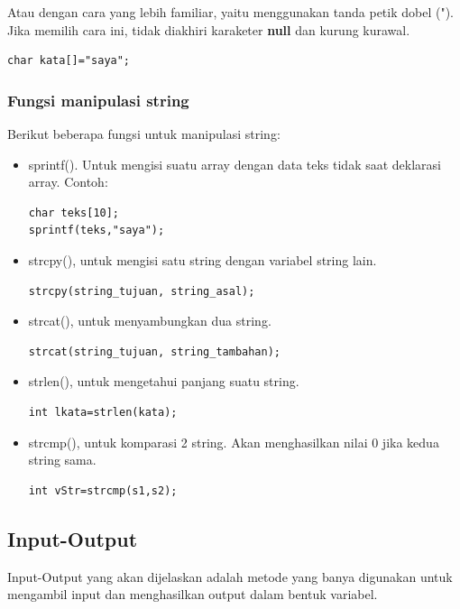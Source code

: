 \documentclass[12pt,]{article}
\begin{document}
	Atau dengan cara yang lebih familiar, yaitu menggunakan tanda petik dobel (").
	Jika memilih cara ini, tidak diakhiri karaketer \textbf{null} dan kurung kurawal.
	\begin{verbatim}
char kata[]="saya";
	\end{verbatim}
	
	\subsubsection{Fungsi manipulasi string}
	Berikut beberapa fungsi untuk manipulasi string:
	\begin{itemize}
		\item sprintf(). Untuk mengisi suatu array dengan data teks tidak saat deklarasi array.
		Contoh:
		\begin{verbatim}
char teks[10];
sprintf(teks,"saya");
		\end{verbatim}
		
		\item strcpy(), untuk mengisi satu string dengan variabel string lain.
		\begin{verbatim}
strcpy(string_tujuan, string_asal);
		\end{verbatim}
		
		\item strcat(), untuk menyambungkan dua string.
		\begin{verbatim}
strcat(string_tujuan, string_tambahan);
		\end{verbatim}
		
		\item strlen(), untuk mengetahui panjang suatu string.
		\begin{verbatim}
int lkata=strlen(kata);
		\end{verbatim}
		
		\item strcmp(), untuk komparasi 2 string.
		Akan menghasilkan nilai 0 jika kedua string sama.
		\begin{verbatim}
int vStr=strcmp(s1,s2);
		\end{verbatim}
	\end{itemize}
	
	\newpage
	\subsection{Input-Output}
	Input-Output yang akan dijelaskan adalah metode yang banya digunakan untuk mengambil input dan menghasilkan output dalam bentuk variabel.
		
\end{document}
